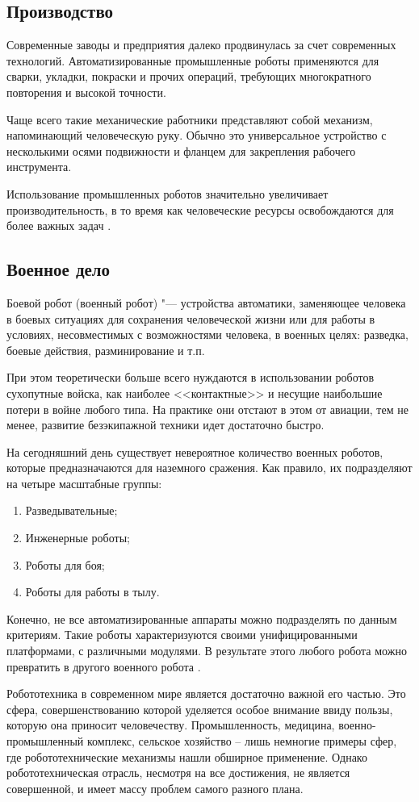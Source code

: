 \documentclass[bachelor, och, referat]{SCWorks}
\begin{document}
\subsection{Производство}

Современные заводы и предприятия далеко продвинулась за счет современных технологий. Автоматизированные промышленные роботы применяются для сварки, укладки, покраски и прочих операций, требующих многократного повторения и высокой точности.

Чаще всего такие механические работники представляют собой механизм, напоминающий человеческую руку. Обычно это универсальное устройство с несколькими осями подвижности и фланцем для закрепления рабочего инструмента.

Использование промышленных роботов значительно увеличивает производительность, в то время как человеческие ресурсы освобождаются для более важных задач \cite{7}.

\subsection{Военное дело}

Боевой робот (военный робот) "--- устройства автоматики, заменяющее человека в боевых ситуациях для сохранения человеческой жизни или для работы в условиях, несовместимых с возможностями человека, в военных целях: разведка, боевые действия, разминирование и т.п.

При этом теоретически больше всего нуждаются в использовании роботов сухопутные войска, как наиболее <<контактные>> и несущие наибольшие потери в войне любого типа. На практике они отстают в этом от авиации, тем не менее, развитие безэкипажной техники идет достаточно быстро.

На сегодняшний день существует невероятное количество военных роботов, которые предназначаются для наземного сражения. Как правило, их подразделяют на четыре масштабные группы:
\begin{enumerate}
    \item Разведывательные;
    \item Инженерные роботы;
    \item Роботы для боя;
    \item Роботы для работы в тылу.
\end{enumerate}

Конечно, не все автоматизированные аппараты можно подразделять по данным критериям. Такие роботы характеризуются своими унифицированными платформами, с различными модулями. В результате этого любого робота можно превратить в другого военного робота \cite{10}.

\conclusion

Робототехника в современном мире является достаточно важной его частью. Это сфера, совершенствованию которой уделяется особое внимание ввиду пользы, которую она приносит человечеству. Промышленность, медицина, военно-промышленный комплекс, сельское хозяйство – лишь немногие примеры сфер, где робототехнические механизмы нашли обширное применение. Однако робототехническая отрасль, несмотря на все достижения, не является совершенной, и имеет массу проблем самого разного плана.



\end{document}
